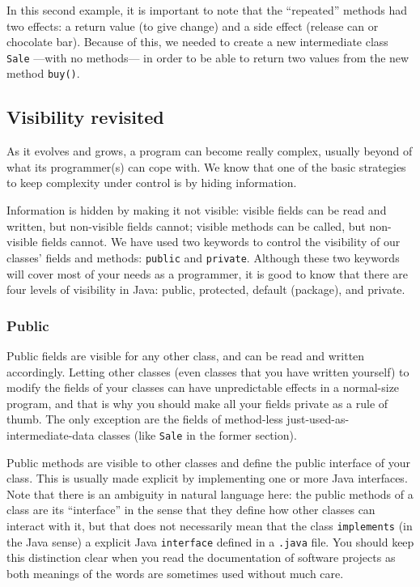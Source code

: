 In this second example, it is important to note
that the ``repeated'' methods had two effects: a return value
(to give change) and a side effect (release can or chocolate bar). Because of
this, we needed to create a new intermediate class \verb+Sale+ ---with
no methods--- in order to be able to return two values from the new
method \verb+buy()+.

\subsection{Visibility revisited}
\label{sec:protected-keyword}

As it evolves and grows, a program can become really complex, usually
beyond of what its programmer(s) can cope with. We know that one of
the basic strategies to keep complexity under control is by hiding
information. 

Information is hidden by making it not visible: visible fields can be
read and written, but non-visible fields cannot; visible methods can
be called, but non-visible fields cannot.  We have used two keywords
to control the visibility of our classes' fields and methods:
\verb+public+ and \verb+private+. Although these two keywords will
cover most of your needs as a programmer, it is good to know that
there are four levels of visibility in Java: public, protected,
default (package), and private.

\subsubsection{Public}
\label{sec:public}

Public fields are visible for any other class, and can be read and
written accordingly. Letting other classes (even classes that you have
written yourself) to modify
the fields of your classes can have unpredictable effects in a
normal-size program, and that is why you should make all your fields
private as a rule of thumb. The only exception are the fields of
method-less just-used-as-intermediate-data classes (like \verb+Sale+
in the former section). 

Public methods are visible to other classes and define the public
interface of your class. This is usually made explicit by implementing
one or more Java interfaces. Note that there is an ambiguity in
natural language here: the public methods of a class are its ``interface''
in the sense that they define how other classes can interact with it,
but that does not necessarily mean that the class \verb+implements+
(in the Java sense) a explicit Java \verb+interface+ defined in a
\verb+.java+ file. You should keep this distinction clear when you
read the documentation of software projects as both meanings of the
words are sometimes used without much care. 

